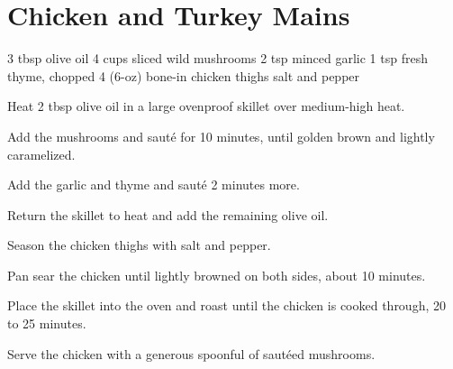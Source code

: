 \chapter{Chicken and Turkey Mains}

\begin{ingreds}
  3 tbsp olive oil
  4 cups sliced wild mushrooms
  2 tsp minced garlic
  1 tsp fresh thyme, chopped
  4 (6-oz) bone-in chicken thighs
  salt and pepper
\end{ingreds}
\begin{method}
  Heat 2 tbsp olive oil in a large ovenproof skillet
  over medium-high heat.

  Add the mushrooms and saut\'e for 10 minutes,
  until golden brown and lightly caramelized.

  Add the garlic and thyme and saut\'e 2 minutes more.

  Return the skillet to heat
  and add the remaining olive oil.

  Season the chicken thighs with salt and pepper.

  Pan sear the chicken until lightly browned
  on both sides, about 10 minutes.

  Place the skillet into the oven and roast
  until the chicken is cooked through, 20 to 25 minutes.

  Serve the chicken with a generous spoonful of
  saut\'eed mushrooms.
\end{method}

